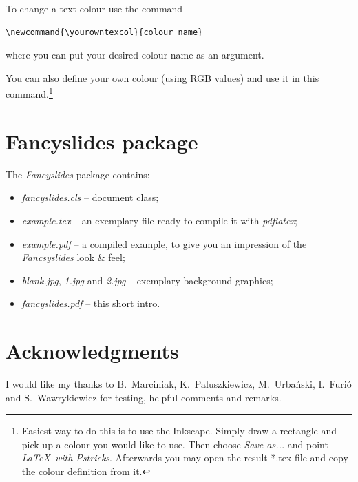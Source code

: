 \documentclass[11pt]{article}
\begin{document}
\noindent
To change a text colour use the command 
\begin{verbatim}
\newcommand{\yourowntexcol}{colour name}
\end{verbatim}
where you can put your desired colour name as an argument. 

You can also define your own colour (using RGB values) and use it in this command.\footnote{Easiest way to do this is to use the Inkscape. Simply draw a rectangle and pick up a colour you would like to use. Then choose \textit{Save as...} and point \textit{\LaTeX\ with Pstricks}. Afterwards you may open the result *.tex file and copy the colour definition from it.}




\section*{Fancyslides package}
The \textit{Fancyslides} package contains:
\begin{itemize}
\item \textit{fancyslides.cls} -- document class;
\item \textit{example.tex} -- an exemplary file ready to compile it with \textit{pdflatex};
\item \textit{example.pdf} -- a compiled example, to give you an impression of the \textit{Fancsyslides} look \& feel;
\item \textit{blank.jpg}, \textit{1.jpg} and \textit{2.jpg} -- exemplary background graphics;
\item \textit{fancyslides.pdf} -- this short intro.
\end{itemize}



\section*{Acknowledgments}
I would like my thanks to B.~Marciniak, K.~Paluszkiewicz, M.~Urbański, I.~Furió and S.~Wawrykiewicz for testing, helpful comments and remarks.
\end{document}
